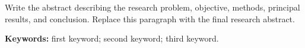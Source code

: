 Write the abstract describing the research problem, objective, methods, principal results, and conclusion. Replace this paragraph with the final research abstract.

\textbf{Keywords:} first keyword; second keyword; third keyword.
